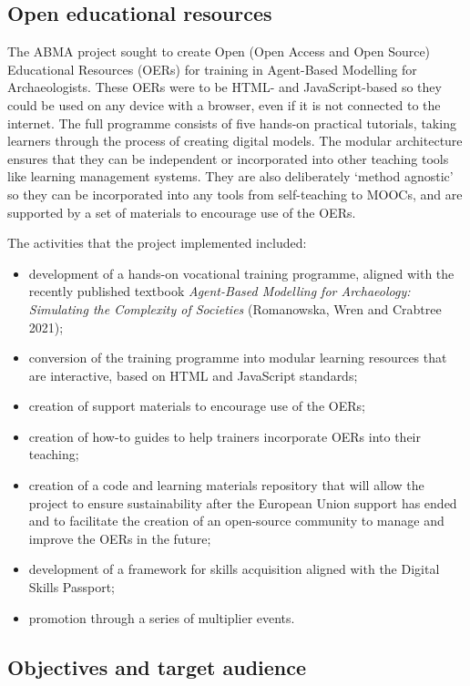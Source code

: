 \documentclass[
]{article}
\begin{document}
\hypertarget{open-educational-resources}{%
\subsection{Open educational resources}\label{open-educational-resources}}

The ABMA project sought to create Open (Open Access and Open Source) Educational Resources (OERs) for training in Agent-Based Modelling for Archaeologists. These OERs were to be HTML- and JavaScript-based so they could be used on any device with a browser, even if it is not connected to the internet. The full programme consists of five hands-on practical tutorials, taking learners through the process of creating digital models. The modular architecture ensures that they can be independent or incorporated into other teaching tools like learning management systems. They are also deliberately `method agnostic' so they can be incorporated into any tools from self-teaching to MOOCs, and are supported by a set of materials to encourage use of the OERs.

The activities that the project implemented included:

\begin{itemize}
\item
  development of a hands-on vocational training programme, aligned with the recently published textbook \emph{Agent-Based Modelling for Archaeology: Simulating the Complexity of Societies} (Romanowska, Wren and Crabtree 2021);
\item
  conversion of the training programme into modular learning resources that are interactive, based on HTML and JavaScript standards;
\item
  creation of support materials to encourage use of the OERs;
\item
  creation of how-to guides to help trainers incorporate OERs into their teaching;
\item
  creation of a code and learning materials repository that will allow the project to ensure sustainability after the European Union support has ended and to facilitate the creation of an open-source community to manage and improve the OERs in the future;
\item
  development of a framework for skills acquisition aligned with the Digital Skills Passport;
\item
  promotion through a series of multiplier events.
\end{itemize}

\hypertarget{objectives-and-target-audience}{%
\subsection{Objectives and target audience}\label{objectives-and-target-audience}}
\end{document}
